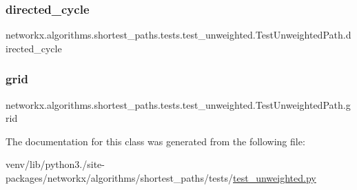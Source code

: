 \subsubsection{\texorpdfstring{directed\+\_\+cycle}{directed\_cycle}}
{\footnotesize\ttfamily networkx.\+algorithms.\+shortest\+\_\+paths.\+tests.\+test\+\_\+unweighted.\+Test\+Unweighted\+Path.\+directed\+\_\+cycle}

\mbox{\label{classnetworkx_1_1algorithms_1_1shortest__paths_1_1tests_1_1test__unweighted_1_1TestUnweightedPath_aea35ef8270158ab9af0e6792fb834153}} 
\subsubsection{\texorpdfstring{grid}{grid}}
{\footnotesize\ttfamily networkx.\+algorithms.\+shortest\+\_\+paths.\+tests.\+test\+\_\+unweighted.\+Test\+Unweighted\+Path.\+grid}



The documentation for this class was generated from the following file\+:\begin{DoxyCompactItemize}
\item 
venv/lib/python3./site-\/packages/networkx/algorithms/shortest\+\_\+paths/tests/\hyperlink{test__unweighted_8py}{test\+\_\+unweighted.\+py}\end{DoxyCompactItemize}
